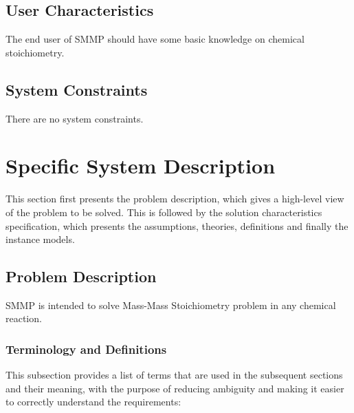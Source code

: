 \documentclass[12pt]{article}
\begin{document}
\subsection{User Characteristics} \label{SecUserCharacteristics}

The end user of SMMP should have some basic knowledge on chemical stoichiometry.

\subsection{System Constraints}

There are no system constraints.

\section{Specific System Description}

This section first presents the problem description, which gives a high-level
view of the problem to be solved.  This is followed by the solution characteristics
specification, which presents the assumptions, theories, definitions and finally
the instance models.  

\subsection{Problem Description} \label{Sec_pd}

SMMP is intended to solve  Mass-Mass Stoichiometry problem in any chemical reaction. 

\subsubsection{Terminology and  Definitions}



This subsection provides a list of terms that are used in the subsequent
sections and their meaning, with the purpose of reducing ambiguity and making it
easier to correctly understand the requirements:
\end{document}

